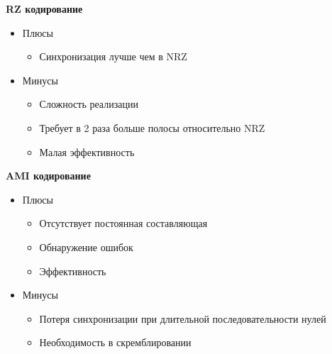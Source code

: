 \documentclass[12pt,a4paper]{report}
\begin{document}
\textbf{RZ кодирование}
\begin{itemize}
    \item Плюсы
    \begin{itemize}
        \item Синхронизация лучше чем в NRZ
    \end{itemize}
    \item Минусы
    \begin{itemize}
        \item Сложность реализации
        \item Требует в 2 раза больше полосы относительно NRZ
        \item Малая эффективность
    \end{itemize}
\end{itemize}
\textbf{AMI кодирование}
\begin{itemize}
    \item Плюсы
    \begin{itemize}
        \item Отсутствует постоянная составляющая
        \item Обнаружение ошибок
        \item Эффективность
    \end{itemize}
    \item Минусы
    \begin{itemize}
        \item Потеря синхронизации при длительной последовательности нулей
        \item Необходимость в скремблировании
    \end{itemize}
\end{itemize}
\end{document}
